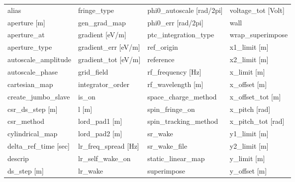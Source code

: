  \begin{tabular}{llll} \toprule
alias                            & fringe_type                      & phi0_autoscale [rad/2pi]         & voltage_tot [Volt]               \\
aperture [m]                     & gen_grad_map                     & phi0_err [rad/2pi]               & wall                             \\
aperture_at                      & gradient [eV/m]                  & ptc_integration_type             & wrap_superimpose                 \\
aperture_type                    & gradient_err [eV/m]              & ref_origin                       & x1_limit [m]                     \\
autoscale_amplitude              & gradient_tot [eV/m]              & reference                        & x2_limit [m]                     \\
autoscale_phase                  & grid_field                       & rf_frequency [Hz]                & x_limit [m]                      \\
cartesian_map                    & integrator_order                 & rf_wavelength [m]                & x_offset [m]                     \\
create_jumbo_slave               & is_on                            & space_charge_method              & x_offset_tot [m]                 \\
csr_ds_step [m]                  & l [m]                            & spin_fringe_on                   & x_pitch [rad]                    \\
csr_method                       & lord_pad1 [m]                    & spin_tracking_method             & x_pitch_tot [rad]                \\
cylindrical_map                  & lord_pad2 [m]                    & sr_wake                          & y1_limit [m]                     \\
delta_ref_time [sec]             & lr_freq_spread [Hz]              & sr_wake_file                     & y2_limit [m]                     \\
descrip                          & lr_self_wake_on                  & static_linear_map                & y_limit [m]                      \\
ds_step [m]                      & lr_wake                          & superimpose                      & y_offset [m]                     \\

\end{tabular}
